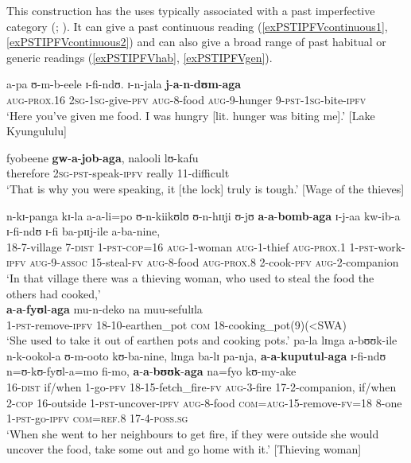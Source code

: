 \largerpage
This construction has the uses typically associated with a past imperfective category (\citealt{ComrieB1976}; \citealt{DahlOe1985}). It can give a past continuous reading (\ref{exPSTIPFVcontinuous1}, \ref{exPSTIPFVcontinuous2}) and can also give a broad range of past habitual or generic readings (\ref{exPSTIPFVhab}, \ref{exPSTIPFVgen}).
\begin{exe}

\ex \label{exPSTIPFVcontinuous1}  
\gll a-pa ʊ-m-b-eele ɪ-fi-ndʊ. ɪ-n-jala \textbf{j}-\textbf{a}-\textbf{n}-\textbf{dʊm}-\textbf{aga}\\
\textsc{aug}-\textsc{prox.16} \textsc{2sg}-\textsc{1sg}-give-\textsc{pfv} \textsc{aug}-8-food \textsc{aug}-9-hunger 9-\textsc{pst}-\textsc{1sg}-bite-\textsc{ipfv}\\
\glt \lq Here you've given me food. I was hungry [lit. hunger was biting me].' [Lake Kyungululu]


\ex 
\label{exPSTIPFVcontinuous2} \gll fyobeene \textbf{gw}-\textbf{a}-\textbf{job}-\textbf{aga}, nalooli lʊ-kafu\\
therefore \textsc{2sg}-\textsc{pst}-speak-\textsc{ipfv} really 11-difficult\\
\glt `That is why you were speaking, it [the lock] truly is tough.' [Wage of the thieves]

\ex
\label{exPSTIPFVhab}
\gll n-kɪ-panga kɪ-la a-a-li=po ʊ-n-kiikʊlʊ ʊ-n-hɪɪji ʊ-jʊ \textbf{a}-\textbf{a}-\textbf{bomb}-\textbf{aga} ɪ-j-aa kw-ib-a ɪ-fi-ndʊ ɪ-fi ba-pɪɪj-ile a-ba-nine,\\
18-7-village 7-\textsc{dist} 1-\textsc{pst}-\textsc{cop}=16 \textsc{aug}-1-woman \textsc{aug}-1-thief \textsc{aug}-\textsc{prox.1} 1-\textsc{pst}-work-\textsc{ipfv} \textsc{aug}-9-\textsc{assoc} 15-steal-\textsc{fv} \textsc{aug}-8-food \textsc{aug}-\textsc{prox.8} 2-cook-\textsc{pfv} \textsc{aug}-2-companion\\
\glt `In that village there was a thieving woman, who used to steal the food the others had cooked,'\\
\sn  \gll \textbf{a}-\textbf{a}-\textbf{fyʊl}-\textbf{aga} mu-n-deko na muu-sefulɪla\\
1-\textsc{pst}-remove-\textsc{ipfv} 18-10-earthen\_pot \textsc{com} 18-cooking\_pot(9)(<SWA)\\
\glt \lq She used to take it out of earthen pots and cooking pots.'
\sn \gll pa-la lɪnga a-bʊʊk-ile n-k-ookol-a ʊ-m-ooto kʊ-ba-nine, lɪnga ba-lɪ pa-nja, \textbf{a}-\textbf{a}-\textbf{kuputul}-\textbf{aga} ɪ-fi-ndʊ n=ʊ-kʊ-fyʊl-a=mo fi-mo, \textbf{a}-\textbf{a}-\textbf{bʊʊk}-\textbf{aga} na=fyo kʊ-my-ake\\
16-\textsc{dist} if/when 1-go-\textsc{pfv} 18-15-fetch\_fire-\textsc{fv} \textsc{aug}-3-fire 17-2-companion, if/when 2-\textsc{cop} 16-outside 1-\textsc{pst}-uncover-\textsc{ipfv} \textsc{aug}-8-food \textsc{com}=\textsc{aug}-15-remove-\textsc{fv}=18 8-one 1-\textsc{pst}-go-\textsc{ipfv} \textsc{com}=\textsc{ref.8} 17-4-\textsc{poss.sg}\\
\glt \lq When she went to her neighbours to get fire, if they were outside she would uncover the food, take some out and go home with it.' [Thieving woman]
\end{exe} 

